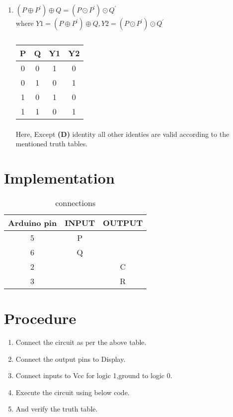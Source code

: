 \documentclass[a4paper,11pt,twocolumn]{article}
\begin{document}
\begin{enumerate}[label=\textbf{(\Alph*})]
	\item \textbf{$(P\oplus P^{\prime})\oplus Q = (P\odot P^{\prime})\odot Q^{\prime}$ }\\
where $Y1=(P\oplus P^{\prime})\oplus Q,Y2=(P\odot
    P^{\prime})\odot Q^{\prime}$\\
\bigskip
\begin{table}[ht!]
	\centering
	\begin{tabular}{ |c |c |c |c |} 
\hline 
\newline 
		\textbf{P} & \textbf{Q} & \textbf{Y1} &  \textbf{Y2}\\ 
\hline 
		0 & 0 &1 &0\\   
 		0 & 1 &0 &1\\  
 		1 & 0 &1 &0\\  
 		1 & 1 &0 &1\\  
 \hline 
 \end{tabular}
	\caption{}
\end{table}
\bigskip

\paragraph{}
	Here, Except \textbf{(D)} identity all other identies are valid according to the mentioned truth tables.
\end{enumerate}
\bigskip

\section{Implementation}
\begin{table}[h]
  \centering
  \caption{connections}
  \begin{tabular}{|c|c|c|}
\hline
Arduino pin & INPUT & OUTPUT\\
\hline
5 & P &\\
\hline
6 & Q &\\
\hline
2 & & C\\
\hline
3 & & R\\
\hline
  \end{tabular}
\end{table}

\section{Procedure}
\begin{enumerate}

   \item Connect the circuit as per the above table.\\
   \item Connect the output pins to Display.\\
   \item Connect inputs to Vcc for logic 1,ground to logic 0.\\
   \item Execute the circuit using below code.\\
   \item And verify the truth table.\\
\end{enumerate}
\end{document}
